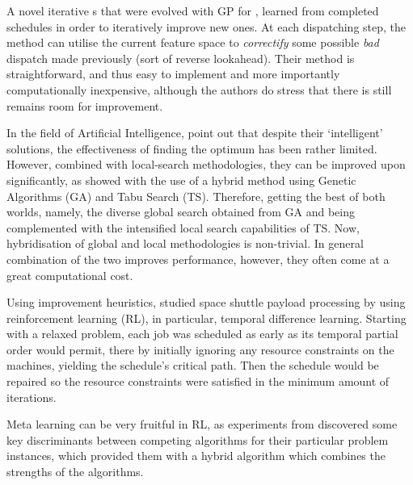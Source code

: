 \documentclass[smallextended]{svjour3}
\begin{document}

A novel iterative \dr s that were evolved with GP for \JSP, \cite{Nguyen13} 
learned from completed schedules in order to iteratively improve new ones. 
At each dispatching step, the method can utilise the current feature space to 
\emph{correctify} some possible \emph{bad} dispatch made previously (sort of 
reverse lookahead). Their method is straightforward, and thus easy to 
implement and more importantly computationally inexpensive, although the 
authors do stress that there is still remains room for improvement.

In the field of Artificial Intelligence, \cite{Meeran12} point out that despite 
their `intelligent' solutions, the effectiveness of finding the optimum has 
been rather limited. However, combined with local-search methodologies, they 
can be improved upon significantly, as \cite{Meeran12} showed with the 
use of a hybrid method using Genetic Algorithms (GA) and Tabu Search (TS). 
Therefore, getting the best of both worlds, namely, the diverse global search 
obtained from GA and being complemented with the intensified local search 
capabilities of TS. 
Now, hybridisation of global and local methodologies is non-trivial. In 
general combination of the two improves performance, however, they often come 
at a great computational cost.  


\vfill 


Using improvement heuristics, \cite{Zhang95} studied space shuttle payload 
processing by using reinforcement learning (RL), in particular, temporal 
difference learning. 
Starting with a relaxed problem, each job was scheduled as early as its 
temporal partial order would permit, there by initially ignoring any resource 
constraints on the machines, yielding the schedule's critical path. Then the 
schedule would be repaired so the resource constraints were satisfied in the 
minimum amount of iterations.

\vfill

Meta learning can be very fruitful in RL, as experiments from 
\cite{Kalyanakrishnan11} discovered some key discriminants between 
competing algorithms for their particular problem instances, which provided 
them with a hybrid algorithm which combines the strengths of the algorithms.
\end{document}
